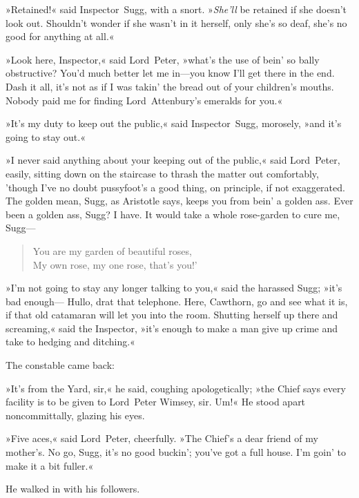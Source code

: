»Retained!« said Inspector~Sugg, with a snort. »\textit{She'll} be retained if she doesn't look out. Shouldn't wonder if she wasn't in it herself, only she's so deaf, she's no good for anything at all.«

»Look here, Inspector,« said Lord~Peter, »what's the use of bein' so bally obstructive? You'd much better let me in—you know I'll get there in the end. Dash it all, it's not as if I was takin' the bread out of your children's mouths. Nobody paid me for finding Lord~Attenbury's emeralds for you.«

»It's my duty to keep out the public,« said Inspector~Sugg, morosely, »and it's going to stay out.«

»I never said anything about your keeping out of the public,« said Lord~Peter, easily, sitting down on the staircase to thrash the matter out comfortably, 'though I've no doubt pussyfoot's a good thing, on principle, if not exaggerated. The golden mean, Sugg, as Aristotle says, keeps you from bein' a golden ass. Ever been a golden ass, Sugg? I have. It would take a whole rose-garden to cure me, Sugg—

\begin{verse}
You are my garden of beautiful roses,\\
My own rose, my one rose, that's you!'
\end{verse}

»I'm not going to stay any longer talking to you,« said the harassed Sugg; »it's bad enough— Hullo, drat that telephone. Here, Cawthorn, go and see what it is, if that old catamaran will let you into the room. Shutting herself up there and screaming,« said the Inspector, »it's enough to make a man give up crime and take to hedging and ditching.«

The constable came back:

»It's from the Yard, sir,« he said, coughing apologetically; »the Chief says every facility is to be given to Lord~Peter Wimsey, sir. Um!« He stood apart noncommittally, glazing his eyes.

»Five aces,« said Lord~Peter, cheerfully. »The Chief's a dear friend of my mother's. No go, Sugg, it's no good buckin'; you've got a full house. I'm goin' to make it a bit fuller.«

He walked in with his followers.

